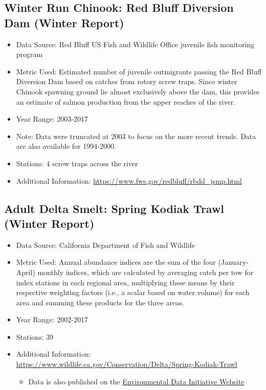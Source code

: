 \documentclass[
]{book}
\providecommand{\tightlist}{%
  \setlength{\itemsep}{0pt}\setlength{\parskip}{0pt}}
\begin{document}
\hypertarget{winter-run-chinook-red-bluff-diversion-dam-winter-report}{%
\subsection{Winter Run Chinook: Red Bluff Diversion Dam (Winter Report)}\label{winter-run-chinook-red-bluff-diversion-dam-winter-report}}

\begin{itemize}
\tightlist
\item
  Data Source: Red Bluff US Fish and Wildlife Office juvenile fish monitoring program
\item
  Metric Used: Estimated number of juvenile outmigrants passing the Red Bluff Diversion Dam based on catches from rotory screw traps. Since winter Chinook spawning ground lie almost exclusively above the dam, this provides an estimate of salmon production from the upper reaches of the river.
\item
  Year Range: 2003-2017
\item
  Note: Data were truncated at 2003 to focus on the more recent trends. Data are also available for 1994-2000.
\item
  Stations: 4 screw traps across the river
\item
  Additional Information: \url{https://www.fws.gov/redbluff/rbdd_jsmp.html}
\end{itemize}

\hypertarget{adult-delta-smelt-spring-kodiak-trawl-winter-report}{%
\subsection{Adult Delta Smelt: Spring Kodiak Trawl (Winter Report)}\label{adult-delta-smelt-spring-kodiak-trawl-winter-report}}

\begin{itemize}
\tightlist
\item
  Data Source: California Department of Fish and Wildlife
\item
  Metric Used: Annual abundance indices are the sum of the four (January-April) monthly indices, which are calculated by averaging catch per tow for index stations in each regional area, multiplying these means by their respective weighting factors (i.e., a scalar based on water volume) for each area and summing these products for the three areas.
\item
  Year Range: 2002-2017
\item
  Stations: 39
\item
  Additional Information: \url{https://www.wildlife.ca.gov/Conservation/Delta/Spring-Kodiak-Trawl}

  \begin{itemize}
  \tightlist
  \item
    Data is also published on the \href{https://doi.org/10.6073/pasta/aeea28f969ed79086b845e1f6ab89d18}{Environmental Data Initiative Website}
  \end{itemize}
\end{itemize}
\end{document}
